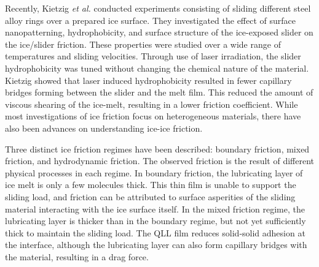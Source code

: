 Recently, Kietzig \textit{et al.}  conducted experiments consisting of
sliding different steel alloy rings over a prepared ice
surface.\cite{Kietzig2009} They investigated the effect of surface
nanopatterning, hydrophobicity, and surface structure of the
ice-exposed slider on the ice/slider friction.  These properties were
studied over a wide range of temperatures and sliding
velocities. %
Through use of laser irradiation, the slider hydrophobicity was tuned
without changing the chemical nature of the material. Kietzig showed
that laser induced hydrophobicity resulted in fewer capillary bridges
forming between the slider and the melt film. This reduced the amount
of viscous shearing of the ice-melt, resulting in a lower friction
coefficient.
While most investigations of ice friction focus on heterogeneous
materials\cite{Bowden1939,Evans1976,Derjaguin1988,Liang2003,Liang2005,Baurle2006,Baurle2007,Kietzig2009,Kietzig2010},
there have also been advances on understanding ice-ice friction\cite{Oksanen1982,Kennedy2000,Maeno2004,Fortt2007,Fortt2011,Lishman2011,Samadashvili2013}.


Three distinct ice friction regimes have been described: boundary
friction, mixed friction, and hydrodynamic
friction.\cite{Bhushan2002,Kietzig2009,Kietzig2010,Persson2015,Tuononen2016}
The observed friction is the result of different physical processes in
each regime. In boundary friction, the lubricating layer of ice melt
is only a few molecules thick. This thin film is unable to support the
sliding load, and friction can be attributed to surface asperities of
the sliding material interacting with the ice surface
itself.\cite{Bhushan2002} In the mixed friction regime, the
lubricating layer is thicker than in the boundary regime, but not yet
sufficiently thick to maintain the sliding load. The QLL film reduces
solid-solid adhesion at the interface, although the lubricating layer
can also form capillary bridges with the material, resulting in a drag
force.\cite{Kietzig2009,Kietzig2010}

